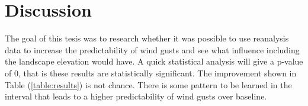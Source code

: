 \chapter{Discussion}
\label{Chapter6}
The goal of this tesis was to research whether it was possible to use reanalysis data to increase the predictability of wind gusts and see what influence including the landscape elevation would have. A quick statistical analysis will give a p-value of 0, that is these results are statistically significant. The improvement shown in Table (\ref{table:results}) is not chance. There is some pattern to be learned in the interval that leads to a higher predictability of wind gusts over baseline.